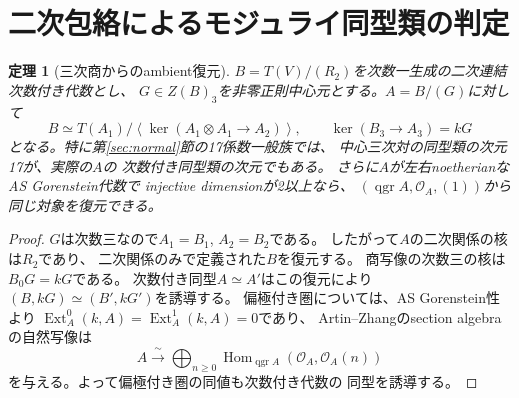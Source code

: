 \documentclass[11pt,a4paper]{ltjsarticle}
\numberwithin{equation}{section}
\newtheorem{theorem}{定理}[section]
\newcommand{\OO}{\mathcal O}
\newcommand{\qgr}{\operatorname{qgr}}
\begin{document}







\section{二次包絡によるモジュライ同型類の判定}\label{sec:moduli-iso}
\begin{theorem}[三次商からのambient復元]\label{thm:moduli-iso}
$B=T(V)/(R_2)$を次数一生成の二次連結次数付き代数とし、
$G\in Z(B)_3$を非零正則中心元とする。$A=B/(G)$に対して
\begin{equation}\label{eq:moduli-envelope}
 B\simeq T(A_1)/
 \left\langle\ker(A_1\otimes A_1\longrightarrow A_2)\right\rangle,
 \qquad \ker(B_3\longrightarrow A_3)=kG
\end{equation}
となる。特に第\ref{sec:normal}節の17係数一般族では、
中心三次対の同型類の次元17が、実際の$A$の
次数付き同型類の次元でもある。
さらに$A$が左右noetherianなAS Gorenstein代数で
injective dimensionが2以上なら、
$(\qgr A,\OO_A,(1))$から同じ対象を復元できる。
\end{theorem}
\begin{proof}
$G$は次数三なので$A_1=B_1$, $A_2=B_2$である。
したがって$A$の二次関係の核は$R_2$であり、
二次関係のみで定義された$B$を復元する。
商写像の次数三の核は$B_0G=kG$である。
次数付き同型$A\simeq A'$はこの復元により
$(B,kG)\simeq(B',kG')$を誘導する。
偏極付き圏については、AS Gorenstein性より
$\operatorname{Ext}_A^0(k,A)=\operatorname{Ext}_A^1(k,A)=0$であり、
Artin--Zhangのsection algebraの自然写像は
\begin{equation}\label{eq:moduli-section}
 A\xrightarrow{\ \sim\ }\bigoplus_{n\ge0}
 \operatorname{Hom}_{\qgr A}(\OO_A,\OO_A(n))
\end{equation}
を与える。よって偏極付き圏の同値も次数付き代数の
同型を誘導する。
\end{proof}



\end{document}
